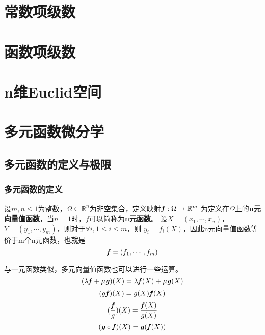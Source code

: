 \documentclass[UTF8,openany]{book}
\begin{document}
	\chapter{常数项级数}

	\chapter{函数项级数}

	\chapter{n维Euclid空间}

	\chapter{多元函数微分学}
	\section{多元函数的定义与极限}
	\subsection{多元函数的定义}
	\par 设$m,n\leqslant1$为整数，$\Omega\subseteq\mathbb{R}^n$为非空集合，定义映射$\textbf{\textit{f}}:\Omega\rightarrow\mathbb{R}^m$
	为定义在$\Omega$上的\textbf{n元向量值函数}，当$n=1$时，$f$可以简称为\textbf{n元函数}。
	设$X=(x_1,\cdots,x_n)$，$Y=(y_1,\cdots,y_m)$，则对于$\forall i, 1\leqslant i\leqslant m$，则
	$y_i=f_i(X)$，因此n元向量值函数等价于m个n元函数，也就是
	\[
	\textbf{\textit{f}}=(f_1,\cdots,f_m)	
	\]
	\par 与一元函数类似，多元向量值函数也可以进行一些运算。
	$$(\lambda\textbf{\textit{f}}+\mu\textbf{\textit{g}})(X)=\lambda\textbf{\textit{f}}(X)+
	\mu\textbf{\textit{g}}(X)$$
	$$(g\textbf{\textit{f}})(X)=g(X)\textbf{\textit{f}}(X)$$
	$$(\frac{\textbf{\textit{f}}}{g})(X)=\frac{\textbf{\textit{f}}(X)}{g(X)}$$
	$$(\textbf{\textit{g}}\circ\textbf{\textit{f}})(X)=\textbf{\textit{g}}(\textbf{\textit{f}}(X))$$
\end{document}
